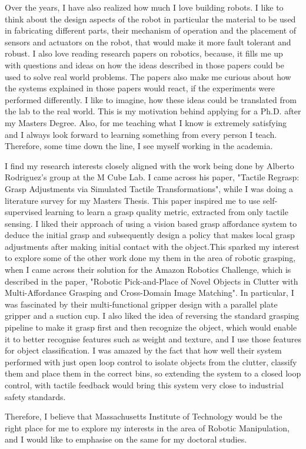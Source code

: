 \documentclass[10pt]{article}
\newcommand{\statement}[1]{\par\medskip
  \textcolor{blue}{\textbf{#1:}}\space
}
\begin{document}
\par
 Over the years, I have also realized how much I love building robots. I like to think about the design aspects of the robot in particular the material to be used in fabricating different parts, their mechanism of operation and the placement of sensors and actuators on the robot, that would make it more fault tolerant and robust.  I also love reading research papers on robotics, because, it fills me up with questions and ideas on how the ideas described in those papers could be used to solve real world problems. The papers also make me curious about how the systems explained in those papers would react, if the experiments were performed differently. I like to imagine, how these ideas could be translated from the lab to the real world. This is my motivation behind applying for a Ph.D. after my Masters Degree. Also, for me teaching what I know is extremely satisfying and I always look forward to learning something from every person I teach. Therefore, some time down the line, I see myself working in the academia. 
\par
I find my research interests closely aligned with the work being done by Alberto Rodriguez's group at the M Cube Lab. I came across his paper, "Tactile Regrasp: Grasp Adjustments via Simulated
Tactile Transformations", while I was doing a literature survey for my Masters Thesis. This paper inspired me to use self-supervised learning to learn a grasp quality metric, extracted from only tactile sensing. I liked their approach of using a vision based grasp affordance system to deduce the initial grasp and subsequently design a policy that makes local grasp adjustments after making initial contact with the object.This sparked my interest to explore some of the other work done my them in the area of robotic grasping, when I came across their solution for the Amazon Robotics Challenge, which is described in the paper, "Robotic Pick-and-Place of Novel Objects in Clutter with Multi-Affordance Grasping and Cross-Domain Image Matching". In particular, I was fascinated by their multi-functional gripper design with a parallel plate gripper and a suction cup. I also liked the idea of reversing the standard grasping pipeline to make it grasp first and then recognize the object, which would enable it to better recognise features such as weight and texture, and I use those features for object classification. I was amazed by the fact that how well their system performed with just open loop control to isolate objects from the clutter, classify them and place them in the correct bins, so extending the system to a closed loop control, with tactile feedback would bring this system very close to industrial safety standards. 
\par
Therefore, I believe that Massachusetts Institute of Technology would be the right place for me to explore my interests in the area of Robotic Manipulation, and I would like to emphasise on the same for my doctoral studies. 










%
%
\end{document}
